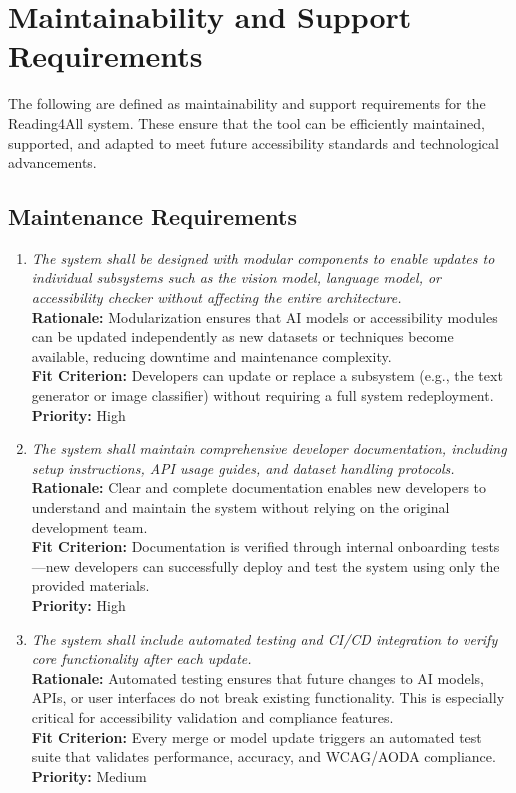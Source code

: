 \documentclass[12pt]{article}
\begin{document}
\section{Maintainability and Support Requirements}

The following are defined as maintainability and support requirements for the Reading4All system. These ensure that the tool can be efficiently maintained, supported, and adapted to meet future accessibility standards and technological advancements.

\subsection{Maintenance Requirements}

\begin{enumerate}[label=MS-MNT\arabic*., wide=0pt, leftmargin=*]
  \item \emph{The system shall be designed with modular components to enable updates to individual subsystems such as the vision model, language model, or accessibility checker without affecting the entire architecture.}\\[2mm]
    {\bf Rationale:} Modularization ensures that AI models or accessibility modules can be updated independently as new datasets or techniques become available, reducing downtime and maintenance complexity.\\
    {\bf Fit Criterion:} Developers can update or replace a subsystem (e.g., the text generator or image classifier) without requiring a full system redeployment.\\
    {\bf Priority:} High

  \item \emph{The system shall maintain comprehensive developer documentation, including setup instructions, API usage guides, and dataset handling protocols.}\\[2mm]
    {\bf Rationale:} Clear and complete documentation enables new developers to understand and maintain the system without relying on the original development team.\\
    {\bf Fit Criterion:} Documentation is verified through internal onboarding tests—new developers can successfully deploy and test the system using only the provided materials.\\
    {\bf Priority:} High

  \item \emph{The system shall include automated testing and CI/CD integration to verify core functionality after each update.}\\[2mm]
    {\bf Rationale:} Automated testing ensures that future changes to AI models, APIs, or user interfaces do not break existing functionality. This is especially critical for accessibility validation and compliance features.\\
    {\bf Fit Criterion:} Every merge or model update triggers an automated test suite that validates performance, accuracy, and WCAG/AODA compliance.\\
    {\bf Priority:} Medium
\end{enumerate}
\end{document}
